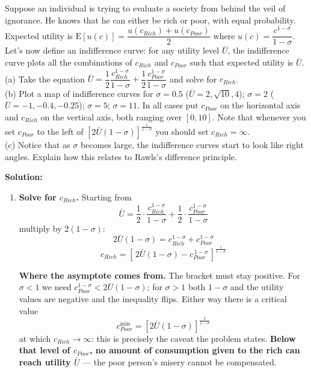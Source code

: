 \documentclass[12pt, letterpaper]{article}
\newcommand{\E}{\mathrm{E}}
\begin{document}
\begin{tcolorbox}[evenbox,title={Problem 2.10 \quad Risk Aversion and the Difference Principle}]
\begin{tcolorbox}[questionbox]
Suppose an individual is trying to evaluate a society from behind the veil of ignorance. He
knows that he can either be rich or poor, with equal probability. Expected utility is
$\E[u(c)] = \dfrac{u(c_{Rich}) + u(c_{Poor})}{2}$ where $u(c) = \dfrac{c^{1-\sigma}}{1-\sigma}$.
Let's now define an indifference curve: for any utility level $\bar U$, the indifference curve
plots all the combinations of $c_{Rich}$ and $c_{Poor}$ such that expected utility is
$\bar U$.\\[3pt]
(a) Take the equation
$\bar U = \dfrac{1}{2}\dfrac{c_{Rich}^{1-\sigma}}{1-\sigma} + \dfrac{1}{2}\dfrac{c_{Poor}^{1-\sigma}}{1-\sigma}$
and solve for $c_{Rich}$.\\
(b) Plot a map of indifference curves for $\sigma = 0.5$ ($\bar U = 2, \sqrt{10}, 4$);
$\sigma = 2$ ($\bar U = -1, -0.4, -0.25$); $\sigma = 5$; $\sigma = 11$. In all cases put
$c_{Poor}$ on the horizontal axis and $c_{Rich}$ on the vertical axis, both ranging over
$[0,10]$. Note that whenever you set $c_{Poor}$ to the left of
$\left[2\bar U(1-\sigma)\right]^{\frac{1}{1-\sigma}}$ you should set $c_{Rich} = \infty$.\\
(c) Notice that as $\sigma$ becomes large, the indifference curves start to look like right
angles. Explain how this relates to Rawls's difference principle.
\end{tcolorbox}

\textbf{Solution:}

\begin{enumerate}

\item \textbf{Solve for $c_{Rich}$.} Starting from
$$\bar U = \frac{1}{2}\cdot\frac{c_{Rich}^{1-\sigma}}{1-\sigma}
+ \frac{1}{2}\cdot\frac{c_{Poor}^{1-\sigma}}{1-\sigma}$$
multiply by $2(1-\sigma)$:
$$2\bar U(1-\sigma) = c_{Rich}^{1-\sigma} + c_{Poor}^{1-\sigma}$$
$$\boxed{\;c_{Rich} = \left[\,2\bar U(1-\sigma) - c_{Poor}^{\,1-\sigma}\,\right]^{\frac{1}{1-\sigma}}\;}$$

\textbf{Where the asymptote comes from.} The bracket must stay positive. For $\sigma < 1$
we need $c_{Poor}^{1-\sigma} < 2\bar U(1-\sigma)$; for $\sigma > 1$ both $1-\sigma$ and the
utility values are negative and the inequality flips. Either way there is a critical value
$$c_{Poor}^{\min} = \left[2\bar U(1-\sigma)\right]^{\frac{1}{1-\sigma}}$$
at which $c_{Rich} \to \infty$: this is precisely the caveat the problem states. \textbf{Below
that level of $c_{Poor}$, no amount of consumption given to the rich can reach utility
$\bar U$} --- the poor person's misery cannot be compensated.


\end{enumerate}
\end{tcolorbox}
\end{document}

